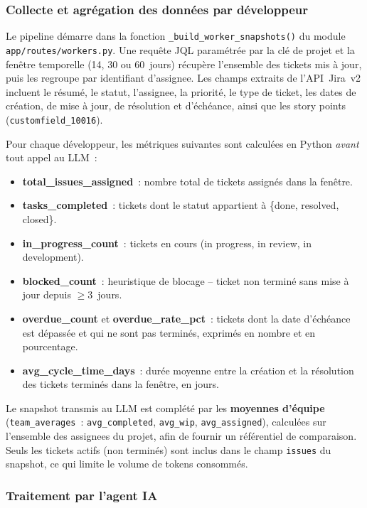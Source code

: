 \subsubsection*{Collecte et agrégation des données par développeur}

Le pipeline démarre dans la fonction \texttt{\_build\_worker\_snapshots()} du module \texttt{app/routes/workers.py}. Une requête JQL paramétrée par la clé de projet et la fenêtre temporelle (14, 30 ou 60~jours) récupère l'ensemble des tickets mis à jour, puis les regroupe par identifiant d'assignee. Les champs extraits de l'API~Jira~v2 incluent le résumé, le statut, l'assignee, la priorité, le type de ticket, les dates de création, de mise à jour, de résolution et d'échéance, ainsi que les story points (\texttt{customfield\_10016}).

Pour chaque développeur, les métriques suivantes sont calculées en Python \emph{avant} tout appel au LLM~:

\begin{itemize}
    \item \textbf{total\_issues\_assigned}~: nombre total de tickets assignés dans la fenêtre.
    \item \textbf{tasks\_completed}~: tickets dont le statut appartient à \{done, resolved, closed\}.
    \item \textbf{in\_progress\_count}~: tickets en cours (in progress, in review, in development).
    \item \textbf{blocked\_count}~: heuristique de blocage -- ticket non terminé sans mise à jour depuis $\geq 3$~jours.
    \item \textbf{overdue\_count} et \textbf{overdue\_rate\_pct}~: tickets dont la date d'échéance est dépassée et qui ne sont pas terminés, exprimés en nombre et en pourcentage.
    \item \textbf{avg\_cycle\_time\_days}~: durée moyenne entre la création et la résolution des tickets terminés dans la fenêtre, en jours.
\end{itemize}

Le snapshot transmis au LLM est complété par les \textbf{moyennes d'équipe} (\texttt{team\_averages}~: \texttt{avg\_completed}, \texttt{avg\_wip}, \texttt{avg\_assigned}), calculées sur l'ensemble des assignees du projet, afin de fournir un référentiel de comparaison. Seuls les tickets actifs (non terminés) sont inclus dans le champ \texttt{issues} du snapshot, ce qui limite le volume de tokens consommés.

\subsubsection*{Traitement par l'agent IA}

